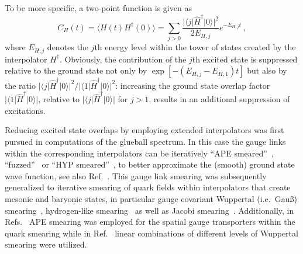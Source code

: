 To be more specific, a two-point function
is given as
\begin{equation}
\label{eq:twopoint}
C_H(t)=\langle H(t)H^{\dagger}(0)\rangle
=\sum_{j>0}\frac{|\langle j|\hat{H}^{\dagger}|0\rangle|^2}{2E_{H,j}}e^{-E_{H,j}t}\,,
\end{equation}
where $E_{H,j}$ denotes the $j$th energy level within the tower
of states created by the interpolator
$H^{\dagger}$. Obviously, the contribution of the $j$th excited
state is suppressed relative to the ground state
not only by $\exp[-(E_{H,j}-E_{H,1})t]$ but also
by the ratio
$|\langle j|\hat{H}^{\dagger}|0\rangle|^2/|\langle 1|\hat{H}^{\dagger}|0\rangle|^2$:
increasing the ground state overlap factor
$|\langle 1|\hat{H}^{\dagger}|0\rangle|$,
relative to $|\langle j|\hat{H}^{\dagger}|0\rangle|$ for $j>1$,
results in an additional suppression of excitations.

Reducing excited state overlaps by employing extended
interpolators was first pursued in computations of the
glueball spectrum. In this case the gauge links within the corresponding
interpolators can be iteratively ``APE smeared''~\cite{Falcioni:1984ei},
``fuzzed''~\cite{Teper:1987wt} or ``HYP smeared''~\cite{Hasenfratz:2001hp},
to better approximate the (smooth) ground state wave function, see
also Ref.~\cite{Gupta:1990ek}.
This gauge link smearing was subsequently generalized
to iterative smearing of quark fields within interpolators
that create mesonic and baryonic states, in particular gauge covariant Wuppertal
(i.e.~Gau\ss{}) smearing~\cite{Gusken:1989ad,Gusken:1989qx,Alexandrou:1990dq},
hydrogen-like smearing~\cite{Alexandrou:1990dq}
as well as Jacobi smearing~\cite{Collins:1992rp,Allton:1993wc}.
Additionally, in Refs.~\cite{Gusken:1989qx,Alexandrou:1990dq,Bali:2005fu}
APE smearing was employed for the spatial gauge transporters within
the quark smearing while in Ref.~\cite{Bali:2005fu}
linear combinations of different levels of Wuppertal smearing
were utilized.

